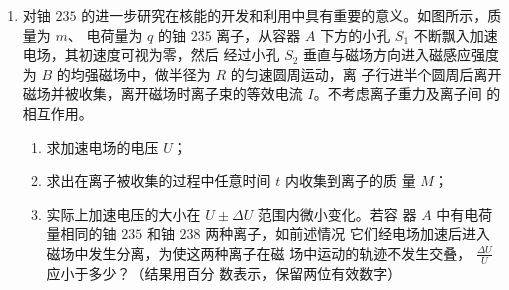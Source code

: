 \begin{enumerate}

\item 
{}
对铀 $ 235 $ 的进一步研究在核能的开发和利用中具有重要的意义。如图所示，质量为 $ m $、
电荷量为 $ q $ 的铀 $ 235 $ 离子，从容器 $ A $ 下方的小孔 $ S_{1} $ 不断飘入加速电场，其初速度可视为零，然后
经过小孔 $ S_{2} $ 垂直与磁场方向进入磁感应强度为 $ B $ 的均强磁场中，做半径为 $ R $ 的匀速圆周运动，离
子行进半个圆周后离开磁场并被收集，离开磁场时离子束的等效电流 $ I $。不考虑离子重力及离子间
的相互作用。
\begin{enumerate}
	\item
求加速电场的电压 $ U $；

\item 
求出在离子被收集的过程中任意时间 $ t $ 内收集到离子的质
量 $ M $；


\item 
实际上加速电压的大小在 $ U \pm \Delta U $ 范围内微小变化。若容
器 $ A $ 中有电荷量相同的铀 $ 235 $ 和铀 $ 238 $ 两种离子，如前述情况
它们经电场加速后进入磁场中发生分离，为使这两种离子在磁
场中运动的轨迹不发生交叠，
$\frac{\Delta U}{U}$
应小于多少？（结果用百分
数表示，保留两位有效数字）


\end{enumerate}
\end{enumerate}
